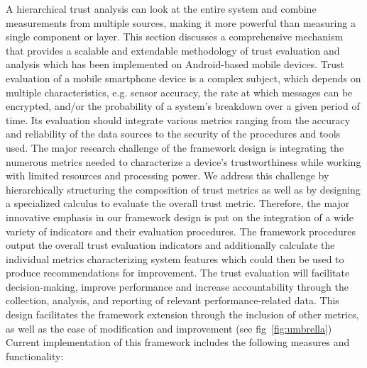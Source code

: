 A hierarchical trust analysis can look at the entire system and combine measurements from multiple sources, making
it more powerful than measuring a single component or layer.
This section discusses a comprehensive mechanism that provides a scalable and extendable methodology of trust
 evaluation and analysis which has been implemented on Android-based mobile devices.
Trust evaluation of a mobile smartphone device is a complex subject, which depends on multiple characteristics, 
e.g. sensor accuracy, the rate at which messages can be encrypted,
 and/or the probability of a system's breakdown over a given period of time. Its evaluation should integrate various metrics ranging from the accuracy and reliability of the data sources to the security of the procedures and tools used. The major research challenge of the framework design is integrating the numerous metrics needed to characterize a device's trustworthiness while working with limited resources and processing power. 
We address this challenge by hierarchically structuring the composition of trust metrics as well as by designing a specialized calculus to evaluate the overall trust metric. 
Therefore, the major innovative emphasis in our framework design is put on the integration of a wide variety of indicators and their evaluation procedures. The framework procedures output the overall trust evaluation indicators and additionally 
calculate the individual metrics characterizing system features which could then be used to produce recommendations for improvement. 
The trust evaluation will facilitate decision-making, improve performance and increase accountability through the collection, analysis, and reporting of relevant performance-related data. This design facilitates the framework extension through
 the inclusion of other metrics, as well as the ease of modification and improvement (see fig~\ref{fig:umbrella})
Current implementation of this framework includes the following measures and functionality: 

